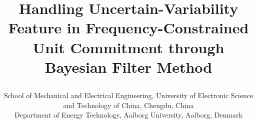 \documentclass[lettersize,journal]{IEEEtran}
\begin{document}
% 


\vspace{-2.5in}

\title{ \vspace{-0.5em}

	{\selectfont \fontsize{20}{20}\selectfont Handling Uncertain-Variability Feature in Frequency-Constrained Unit Commitment through Bayesian Filter Method }}

\vspace{-2.5in}

\author{\fontsize{10}{6} \selectfont
{}

	\IEEEauthorblockA
	{
		School of Mechanical and Electrical Engineering,
		University of Electronic Science and Technology of China,
		Chengdu, China
	}
	\\
	\IEEEauthorblockA
	{
		Department of Energy Technology,
		Aalborg University,
		Aalborg, Denmark
	}
}

\vspace{-2.5cm}

\end{document}
